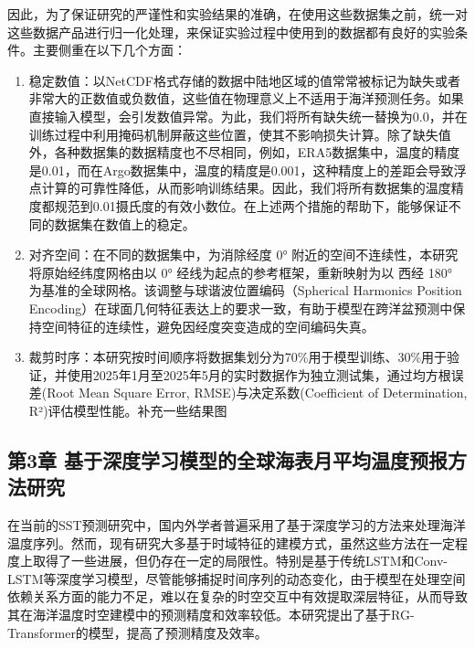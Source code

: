 \documentclass[
  12pt,
]{article}
\begin{document}
因此，为了保证研究的严谨性和实验结果的准确，在使用这些数据集之前，统一对这些数据产品进行归一化处理，来保证实验过程中使用到的数据都有良好的实验条件。主要侧重在以下几个方面：

\begin{enumerate}
\def\labelenumi{\arabic{enumi}.}
\item
  稳定数值：以NetCDF格式存储的数据中陆地区域的值常常被标记为缺失或者非常大的正数值或负数值，这些值在物理意义上不适用于海洋预测任务。如果直接输入模型，会引发数值异常。为此，我们将所有缺失统一替换为0.0，并在训练过程中利用掩码机制屏蔽这些位置，使其不影响损失计算。除了缺失值外，各种数据集的数据精度也不尽相同，例如，ERA5数据集中，温度的精度是0.01，而在Argo数据集中，温度的精度是0.001，这种精度上的差距会导致浮点计算的可靠性降低，从而影响训练结果。因此，我们将所有数据集的温度精度都规范到0.01摄氏度的有效小数位。在上述两个措施的帮助下，能够保证不同的数据集在数值上的稳定。
\item
  对齐空间：在不同的数据集中，为消除经度 0°
  附近的空间不连续性，本研究将原始经纬度网格由以 0°
  经线为起点的参考框架，重新映射为以 西经 180°
  为基准的全球网格。该调整与球谐波位置编码（Spherical Harmonics Position
  Encoding）在球面几何特征表达上的要求一致，有助于模型在跨洋盆预测中保持空间特征的连续性，避免因经度突变造成的空间编码失真。
\item
  裁剪时序：本研究按时间顺序将数据集划分为70\%用于模型训练、30\%用于验证，并使用2025年1月至2025年5月的实时数据作为独立测试集，通过均方根误差(Root
  Mean Square Error, RMSE)与决定系数(Coefficient of Determination,
  R²)评估模型性能。补充一些结果图
\end{enumerate}

\subsection{第3章
基于深度学习模型的全球海表月平均温度预报方法研究}\label{ux7b2c3ux7ae0-ux57faux4e8eux6df1ux5ea6ux5b66ux4e60ux6a21ux578bux7684ux5168ux7403ux6d77ux8868ux6708ux5e73ux5747ux6e29ux5ea6ux9884ux62a5ux65b9ux6cd5ux7814ux7a76}

在当前的SST预测研究中，国内外学者普遍采用了基于深度学习的方法来处理海洋温度序列。然而，现有研究大多基于时域特征的建模方式，虽然这些方法在一定程度上取得了一些进展，但仍存在一定的局限性。特别是基于传统LSTM和Conv-LSTM等深度学习模型，尽管能够捕捉时间序列的动态变化，由于模型在处理空间依赖关系方面的能力不足，难以在复杂的时空交互中有效提取深层特征，从而导致其在海洋温度时空建模中的预测精度和效率较低。本研究提出了基于RG-Transformer的模型，提高了预测精度及效率。
\end{document}

